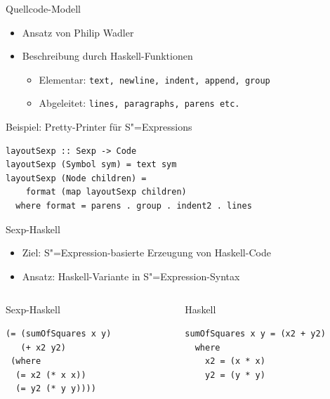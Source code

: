 \documentclass{beamer}
\newcommand{\sexp}{S"=Expression}
\newcommand{\sexps}{S"=Expressions}
\begin{document}
\begin{frame}[fragile]{Quellcode-Modell}
  \begin{itemize}
  \item Ansatz von Philip Wadler
  \item Beschreibung durch Haskell-Funktionen
    \begin{itemize}
    \item Elementar: \verb+text, newline, indent, append, group+
    \item Abgeleitet: \verb+lines, paragraphs, parens etc.+
    \end{itemize}
  \end{itemize}
  \begin{block}{Beispiel: Pretty-Printer für \sexps{}}
\begin{verbatim}
layoutSexp :: Sexp -> Code
layoutSexp (Symbol sym) = text sym
layoutSexp (Node children) = 
    format (map layoutSexp children)
  where format = parens . group . indent2 . lines
\end{verbatim}
  \end{block}
\end{frame}

\begin{frame}[fragile]{Sexp-Haskell}
  \begin{itemize}
  \item Ziel: \sexp{}-basierte Erzeugung von Haskell-Code
  \item Ansatz: Haskell-Variante in \sexp{}-Syntax
  \end{itemize}
  \begin{columns}
    \begin{column}{5cm}
      \begin{block}{Sexp-Haskell}
\begin{verbatim}
(= (sumOfSquares x y)
   (+ x2 y2)
 (where                   
  (= x2 (* x x))
  (= y2 (* y y))))
\end{verbatim}
      \end{block}
    \end{column}
    \begin{column}{6cm}
      \begin{block}{Haskell}
\begin{verbatim}
sumOfSquares x y = (x2 + y2)
  where
    x2 = (x * x)         
    y2 = (y * y)
\end{verbatim}
      \end{block}
    \end{column}
  \end{columns}
\end{frame}
\end{document}
